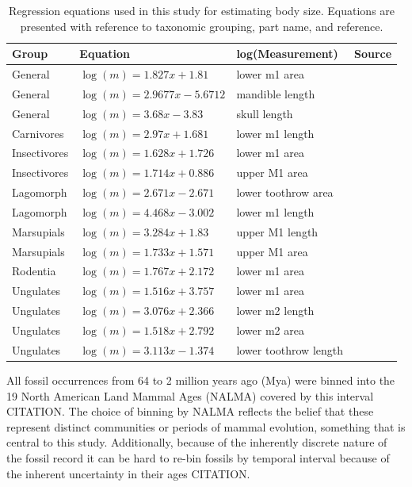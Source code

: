 \documentclass[12pt,letterpaper]{article}
\begin{document}
\begin{table}[ht]
  \centering
  \caption{Regression equations used in this study for estimating body size. Equations are presented with reference to taxonomic grouping, part name, and reference.}
  \begin{tabular}{l | l | l | l}
    \hline
    Group & Equation & log(Measurement) & Source \\
    \hline
    General & \(\log(m) = 1.827x + 1.81\) & lower m1 area &  \cite{Legendre1986} \\
    General & \(\log(m) = 2.9677x - 5.6712\) & mandible length & \cite{Foster2009a} \\
    General & \(\log(m) = 3.68x - 3.83\) & skull length & \cite{Luo2001} \\
    Carnivores & \(\log(m) = 2.97x + 1.681\) & lower m1 length & \cite{VanValkenburgh1990} \\
    Insectivores & \(\log(m) = 1.628x + 1.726\) & lower m1 area & \cite{Bloch1998} \\
    Insectivores & \(\log(m) = 1.714x + 0.886\) & upper M1 area & \cite{Bloch1998} \\
    Lagomorph & \(\log(m) = 2.671x - 2.671\) & lower toothrow area & \cite{Tomiya2013} \\
    Lagomorph & \(\log(m) = 4.468x - 3.002\) & lower m1 length & \cite{Tomiya2013} \\
    Marsupials & \(\log(m) = 3.284x + 1.83\) & upper M1 length & \cite{Gordon2003} \\
    Marsupials & \(\log(m) = 1.733x + 1.571\) & upper M1 area & \cite{Gordon2003} \\
    Rodentia & \(\log(m) = 1.767x + 2.172\) & lower m1 area & \cite{Legendre1986} \\
    Ungulates & \(\log(m) = 1.516x + 3.757\) & lower m1 area & \cite{Mendoza2006} \\
    Ungulates & \(\log(m) = 3.076x + 2.366\) & lower m2 length & \cite{Mendoza2006} \\
    Ungulates & \(\log(m) = 1.518x + 2.792\) & lower m2 area & \cite{Mendoza2006} \\
    Ungulates & \(\log(m) = 3.113x - 1.374\) & lower toothrow length & \cite{Mendoza2006} \\
    \hline
  \end{tabular}
  \label{tab:mass_est}
\end{table}


All fossil occurrences from 64 to 2 million years ago (Mya) were binned into the 19 North American Land Mammal Ages (NALMA) covered by this interval CITATION. The choice of binning by NALMA reflects the belief that these represent distinct communities or periods of mammal evolution, something that is central to this study. Additionally, because of the inherently discrete nature of the fossil record it can be hard to re-bin fossils by temporal interval because of the inherent uncertainty in their ages CITATION.
\end{document}

